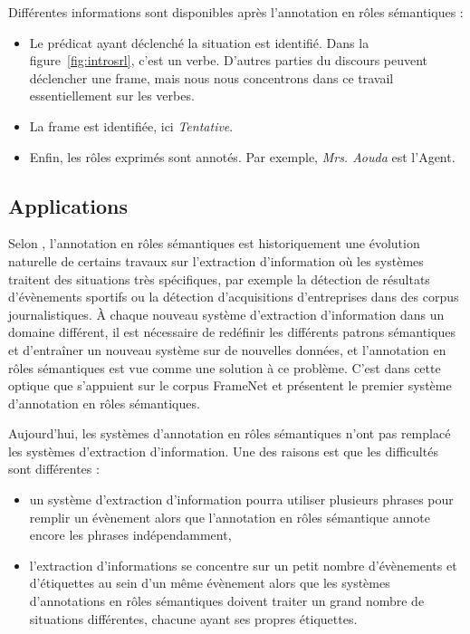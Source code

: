 Différentes informations sont disponibles après l'annotation en rôles
sémantiques :

\begin{itemize}
    \item Le prédicat ayant déclenché la situation est identifié. Dans la
        figure~\ref{fig:introsrl}, c'est un verbe. D'autres parties du discours
        peuvent déclencher une frame, mais nous nous concentrons dans ce
        travail essentiellement sur les verbes.
    \item La frame est identifiée, ici \textit{Tentative}.
    \item Enfin, les rôles exprimés sont annotés. Par exemple, \textit{Mrs.
        Aouda} est l'Agent.
\end{itemize}

\subsection{Applications}

Selon \cite{gildea2002automatic}, l'annotation en rôles sémantiques est
historiquement une évolution naturelle de certains travaux sur l'extraction
d'information où les systèmes traitent des situations très spécifiques, par
exemple la détection de résultats d'évènements sportifs ou la détection
d'acquisitions d'entreprises dans des corpus journalistiques. À chaque nouveau
système d'extraction d'information dans un domaine différent, il est nécessaire
de redéfinir les différents patrons sémantiques et d'entraîner un nouveau
système sur de nouvelles données, et l'annotation en rôles sémantiques est vue
comme une solution à ce problème. C'est dans cette optique que
\citeauthor{gildea2002automatic} s'appuient sur le corpus FrameNet et présentent le
premier système d'annotation en rôles sémantiques.

Aujourd'hui, les systèmes d'annotation en rôles sémantiques n'ont pas remplacé
les systèmes d'extraction d'information. Une des raisons est que les
difficultés sont différentes \citep{boros2014etiquetage} :

\begin{itemize}
    \item un système d'extraction d'information pourra utiliser plusieurs
        phrases pour remplir un évènement alors que l'annotation en rôles
        sémantique annote encore les phrases indépendamment,
    \item l'extraction d'informations se concentre sur un petit nombre
        d'évènements et d'étiquettes au sein d'un même évènement alors que les
        systèmes d'annotations en rôles sémantiques doivent traiter un grand
        nombre de situations différentes, chacune ayant ses propres étiquettes.
\end{itemize}


